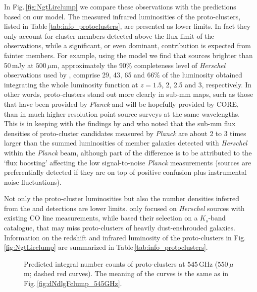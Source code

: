 \documentclass[useAMS,usenatbib]{mn2e}
\begin{document}
%
In Fig.\,\ref{fig:NgtLirclump} we compare these observations with the predictions based
on our model. The measured infrared luminosities of the
proto-clusters, listed in Table\,\ref{tab:info_protoclusters}, are
presented as lower limits. In fact they only account for cluster
members detected above the flux limit of the observations, while a significant, or even dominant, contribution is expected from fainter members. For example, using the \citet{Cai2013} model we find that sources brighter than 50\,mJy at $500\,\mu$m, approximately the 90\% completeness level of \textit{Herschel} observations used by \citet{PlanckCollaborationXXVII2015}, comprise 29, 43, 65 and 66\% of the luminosity obtained integrating the whole luminosity function at $z=1.5$, 2, 2.5 and 3, respectively. In other words, proto-clusters stand out more clearly in sub-mm maps, such as those that have been provided by \textit{Planck} and will be hopefully provided by CORE, than in much higher resolution point source surveys at the same wavelengths. This is in keeping with the findings by \citet{Clements2014} and \citet{PlanckCollaborationXXXIX2015} who noted that the sub-mm flux densities of proto-cluster candidates measured by \textit{Planck} are  about 2 to 3 times larger than the summed luminosities of member galaxies detected with \textit{Herschel} within the \textit{Planck} beam, although part of the difference is to be attributed to the `flux boosting' affecting the low signal-to-noise \textit{Planck} measurements (sources are preferentially detected if they are on top of positive confusion plus instrumental noise fluctuations).

Not only the proto-cluster luminosities but also the number densities inferred from the \citet{Ivison2013} and \citet{Wang2016} detections are lower limits. \citet{Ivison2013} only focused on {\it Herschel} sources with existing CO line measurements, while \citet{Wang2016} based their selection on a $K_{s}$-band catalogue, that may miss proto-clusters of heavily dust-enshrouded galaxies. Information on the redshift and infrared luminosity of the proto-clusters in Fig.\,\ref{fig:NgtLirclump} are summarized in Table\,\ref{tab:info_protoclusters}.


\begin{figure}
\vspace{0.0cm}
\hspace{-4.4cm}
\vspace{-0.6cm}
\caption{Predicted integral number counts of proto-clusters at
  545\,GHz (550\,$\mu$m; dashed red curves). The meaning of the curves
  is the same as in Fig.\,\ref{fig:dNdlgFclump_545GHz}.}
\label{fig:NgtFclump_545GHz}
\end{figure}
\end{document}
